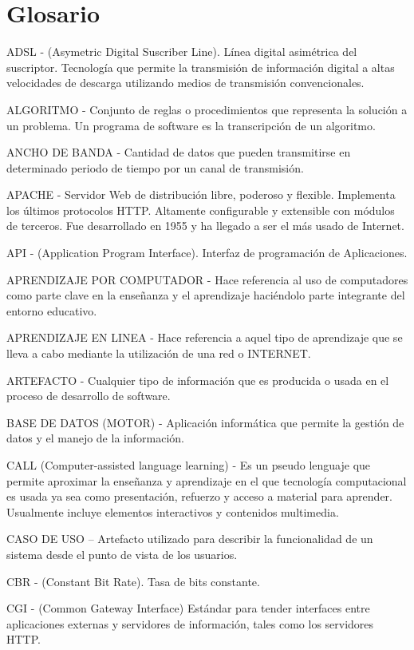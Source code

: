 \chapter*{Glosario}
\label{glosario}

ADSL - (Asymetric Digital Suscriber Line). Línea digital asimétrica del suscriptor. Tecnología que permite la transmisión de información digital a altas velocidades de descarga utilizando medios de transmisión convencionales.

ALGORITMO - Conjunto de reglas o procedimientos que representa la solución a un problema. Un programa de software es la transcripción de un algoritmo.

ANCHO DE BANDA - Cantidad de datos que pueden transmitirse en determinado periodo de tiempo por un canal de transmisión.

APACHE - Servidor Web de distribución libre,  poderoso y flexible. Implementa los últimos protocolos HTTP. Altamente configurable y extensible con módulos de terceros. Fue desarrollado en 1955 y ha llegado a ser el más usado de Internet.

API - (Application Program Interface). Interfaz de programación de Aplicaciones.

APRENDIZAJE POR COMPUTADOR - Hace referencia al uso de computadores como parte clave en la enseñanza y el aprendizaje haciéndolo parte integrante del entorno educativo.

APRENDIZAJE EN LINEA - Hace referencia a aquel tipo de aprendizaje que se lleva a cabo mediante la utilización de una red o INTERNET.

ARTEFACTO - Cualquier tipo de información que es producida o usada en el proceso de desarrollo de software.

BASE DE DATOS (MOTOR) - Aplicación informática que permite la gestión de datos y el manejo de la información.

CALL (Computer-assisted language learning) - Es un pseudo lenguaje que permite aproximar la enseñanza y aprendizaje en el que tecnología computacional es usada ya sea como presentación, refuerzo y acceso a material para aprender.  Usualmente incluye elementos interactivos y contenidos multimedia.

CASO DE USO – Artefacto utilizado para describir la funcionalidad de un sistema desde el punto de vista de los usuarios.

CBR  -  (Constant Bit Rate). Tasa de bits constante.

CGI - (Common Gateway Interface) Estándar para tender interfaces entre aplicaciones externas y servidores de información, tales como los servidores HTTP.

